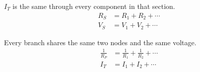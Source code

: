 \documentclass[10pt]{article}
\begin{document}
\clearpage
\thispagestyle{empty}
\begin{minipage}[t][4.00in][c]{0.47\textwidth}
  {\large $I_T$ is the same through every component in that section.}
  \vspace{0.28in}
  {\LARGE
  \begin{align*}
    R_S&=R_1+R_2+\cdots\\[0.16in]
    V_S&=V_1+V_2+\cdots
  \end{align*}}
\end{minipage}\hfill
\begin{minipage}[t][4.00in][c]{0.47\textwidth}
  {\large Every branch shares the same two nodes and the same voltage.}
  \vspace{0.28in}
  {\LARGE
  \begin{align*}
    \frac{1}{R_P}&=\frac{1}{R_1}+\frac{1}{R_2}+\cdots\\[0.16in]
    I_T&=I_1+I_2+\cdots
  \end{align*}}
\end{minipage}
\end{document}

